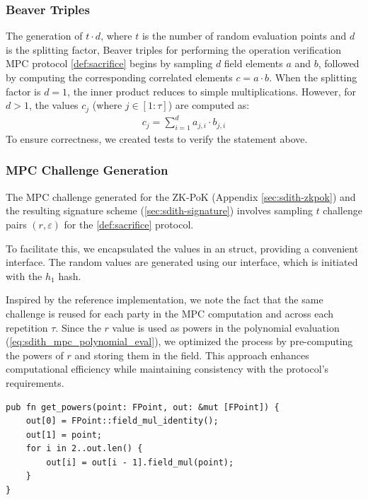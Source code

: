 \documentclass[11pt]{report}
\theoremstyle{definition}
\theoremstyle{plain}
\begin{document}
\subsubsection{Beaver Triples}
The generation of $t \cdot d$, where $t$ is the number of random evaluation points and $d$ is the splitting factor, Beaver triples for performing the operation verification MPC protocol \autoref{def:sacrifice} begins by sampling $d$ field elements $a$ and $b$, followed by computing the corresponding correlated elements $c = a \cdot b$. When the splitting factor is $d=1$, the inner product reduces to simple multiplications. However, for $d > 1$, the values $c_j$ (where $j \in [1:\tau]$) are computed as:
\begin{align}
  c_j = \sum_{i=1}^{d} a_{ j,i } \cdot b_{j,i}
\end{align}
To ensure correctness, we created tests to verify the statement above.

\subsubsection{MPC Challenge Generation}

The MPC challenge generated for the ZK-PoK (Appendix \ref{sec:sdith-zkpok}) and the resulting signature scheme (\autoref{sec:sdith-signature}) involves sampling $t$ challenge pairs $(r, \varepsilon)$ for the \autoref{def:sacrifice} protocol.

To facilitate this, we encapsulated the values in an  struct, providing a convenient interface. The random values are generated using our  interface, which is initiated with the $h_1$ hash.

Inspired by the reference implementation, we note the fact that the same challenge is reused for each party in the MPC computation and across each repetition $\tau$. Since the $r$ value is used as powers in the polynomial evaluation (\autoref{eq:sdith_mpc_polynomial_eval}), we optimized the process by pre-computing the powers of $r$ and storing them in the  field. This approach enhances computational efficiency while maintaining consistency with the protocol's requirements.

\begin{verbatim}
pub fn get_powers(point: FPoint, out: &mut [FPoint]) {
    out[0] = FPoint::field_mul_identity();
    out[1] = point;
    for i in 2..out.len() {
        out[i] = out[i - 1].field_mul(point);
    }
}
\end{verbatim}
\end{document}
